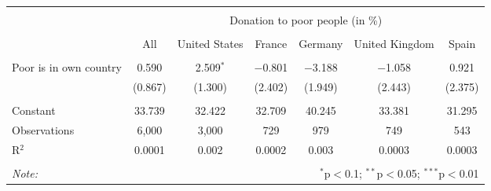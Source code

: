 
\begin{tabular}{@{\extracolsep{5pt}}lcccccc} 
\\[-1.8ex]\hline 
\hline \\[-1.8ex] 
 & \multicolumn{6}{c}{Donation to poor people (in \%)} \\ 
\cline{2-7} 
\\[-1.8ex] & All & United States & France & Germany & United Kingdom & Spain \\ 
\hline \\[-1.8ex] 
 Poor is in own country & 0.590 & 2.509$^{*}$ & $-$0.801 & $-$3.188 & $-$1.058 & 0.921 \\ 
  & (0.867) & (1.300) & (2.402) & (1.949) & (2.443) & (2.375) \\ 
 \hline \\[-1.8ex] 
Constant & 33.739 & 32.422 & 32.709 & 40.245 & 33.381 & 31.295 \\ 
Observations & 6,000 & 3,000 & 729 & 979 & 749 & 543 \\ 
R$^{2}$ & 0.0001 & 0.002 & 0.0002 & 0.003 & 0.0003 & 0.0003 \\ 
\hline 
\hline \\[-1.8ex] 
\textit{Note:}  & \multicolumn{6}{r}{$^{*}$p$<$0.1; $^{**}$p$<$0.05; $^{***}$p$<$0.01} \\ 
\end{tabular} 